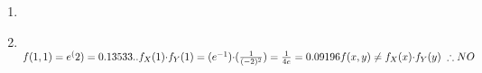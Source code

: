 \documentclass[11pt]{article}
\newcommand\Item[1][]{%
  \ifx\relax#1\relax  \item \else \item[#1] \fi
  \abovedisplayskip=0pt\abovedisplayshortskip=0pt~\vspace*{-\baselineskip}}
\begin{document}
\begin{enumerate}
\begin{enumerate}
                \Item \\
                $f(1,1) = e^(2) = 0.13533..\\
                f_X(1){\cdot}f_{Y}(1) = (e^{-1}){\cdot}(\frac{1}{(-2)^{2}}) = \frac{1}{4e} = 0.09196\\
                f(x,y) \neq f_{X}(x){\cdot}f_{Y}(y)\;\therefore NO$\\

        \end{enumerate}
\end{enumerate}
\end{document}

